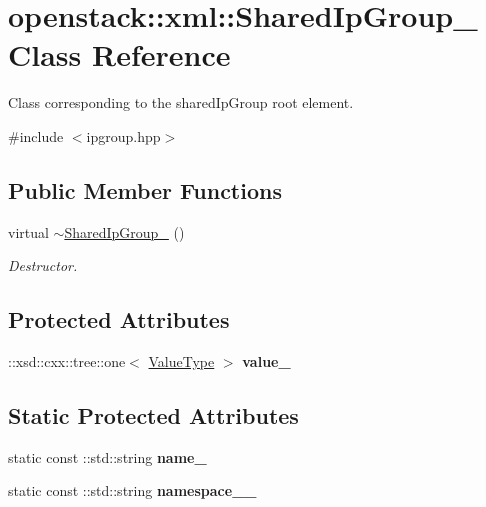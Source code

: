 \hypertarget{classopenstack_1_1xml_1_1SharedIpGroup__}{
\section{openstack::xml::SharedIpGroup\_\- Class Reference}
\label{classopenstack_1_1xml_1_1SharedIpGroup__}
}


Class corresponding to the sharedIpGroup root element.  




{\ttfamily \#include $<$ipgroup.hpp$>$}

\subsection*{Public Member Functions}
\begin{DoxyCompactItemize}
\item 
\hypertarget{classopenstack_1_1xml_1_1SharedIpGroup___a042235e46dfb80f81ad67c6376b93a0c}{
virtual \hyperlink{classopenstack_1_1xml_1_1SharedIpGroup___a042235e46dfb80f81ad67c6376b93a0c}{$\sim$SharedIpGroup\_\-} ()}
\label{classopenstack_1_1xml_1_1SharedIpGroup___a042235e46dfb80f81ad67c6376b93a0c}

\begin{DoxyCompactList}\small\item\em Destructor. \item\end{DoxyCompactList}\end{DoxyCompactItemize}
\subsection*{Protected Attributes}
\begin{DoxyCompactItemize}
\item 
\hypertarget{classopenstack_1_1xml_1_1SharedIpGroup___afa5c74b7628f6a7d9974b10073dec843}{
::xsd::cxx::tree::one$<$ \hyperlink{classopenstack_1_1xml_1_1SharedIpGroup}{ValueType} $>$ {\bfseries value\_\-}}
\label{classopenstack_1_1xml_1_1SharedIpGroup___afa5c74b7628f6a7d9974b10073dec843}

\end{DoxyCompactItemize}
\subsection*{Static Protected Attributes}
\begin{DoxyCompactItemize}
\item 
\hypertarget{classopenstack_1_1xml_1_1SharedIpGroup___ab17fcab9d915832fb676eaaa10ce2dbf}{
static const ::std::string {\bfseries name\_\-}}
\label{classopenstack_1_1xml_1_1SharedIpGroup___ab17fcab9d915832fb676eaaa10ce2dbf}

\item 
\hypertarget{classopenstack_1_1xml_1_1SharedIpGroup___ab92292c7f55275f5ae31edd952d904ae}{
static const ::std::string {\bfseries namespace\_\-\_\-}}
\label{classopenstack_1_1xml_1_1SharedIpGroup___ab92292c7f55275f5ae31edd952d904ae}

\end{DoxyCompactItemize}
